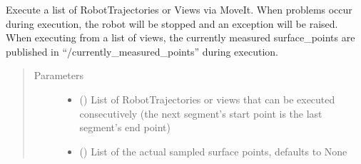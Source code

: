 \documentclass[letterpaper,10pt,english]{sphinxmanual}
\begin{document}
\begin{fulllineitems}
\begin{fulllineitems}
\label{\detokenize{module_trajectory_manager:agiprobot_measurement.trajectory_manager.TrajectoryManager.execute}}
Execute a list of RobotTrajectories or Views via MoveIt. When problems occur during execution,
the robot will be stopped and an exception will be raised. When executing from a list of views, the currently measured surface\_points
are published in “/currently\_measured\_points” during execution.
\begin{quote}\begin{description}
\item[{Parameters}] \leavevmode\begin{itemize}
\item {} 
 (\sphinxstyleliteralemphasis{{[}}\sphinxstyleliteralemphasis{{]} or }\sphinxstyleliteralemphasis{{[}}\sphinxstyleliteralemphasis{{]}}) \textendash{} List of RobotTrajectories or views that can be executed consecutively (the next segment’s start point is the last segment’s end point)

\item {} 
 (\sphinxstyleliteralemphasis{{[}}\sphinxstyleliteralemphasis{{]}}\sphinxstyleliteralemphasis{, }) \textendash{} List of the actual sampled surface points, defaults to None

\end{itemize}

\end{description}\end{quote}

\end{fulllineitems}



\end{fulllineitems}
\end{document}
